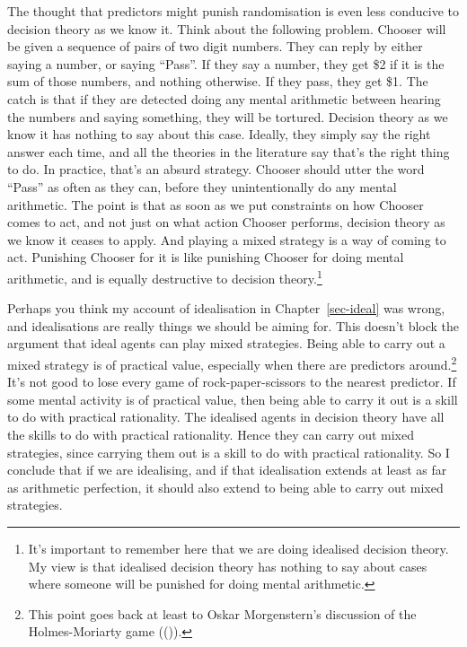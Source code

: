 \documentclass[
  12pt,
  letterpaper,
  DIV=11,
  numbers=noendperiod]{scrreprt}
\begin{document}
The thought that predictors might punish randomisation is even less
conducive to decision theory as we know it. Think about the following
problem. Chooser will be given a sequence of pairs of two digit numbers.
They can reply by either saying a number, or saying ``Pass''. If they
say a number, they get \$2 if it is the sum of those numbers, and
nothing otherwise. If they pass, they get \$1. The catch is that if they
are detected doing any mental arithmetic between hearing the numbers and
saying something, they will be tortured. Decision theory as we know it
has nothing to say about this case. Ideally, they simply say the right
answer each time, and all the theories in the literature say that's the
right thing to do. In practice, that's an absurd strategy. Chooser
should utter the word ``Pass'' as often as they can, before they
unintentionally do any mental arithmetic. The point is that as soon as
we put constraints on how Chooser comes to act, and not just on what
action Chooser performs, decision theory as we know it ceases to apply.
And playing a mixed strategy is a way of coming to act. Punishing
Chooser for it is like punishing Chooser for doing mental arithmetic,
and is equally destructive to decision theory.\footnote{It's important
  to remember here that we are doing idealised decision theory. My view
  is that idealised decision theory has nothing to say about cases where
  someone will be punished for doing mental arithmetic.}

Perhaps you think my account of idealisation in Chapter~\ref{sec-ideal}
was wrong, and idealisations are really things we should be aiming for.
This doesn't block the argument that ideal agents can play mixed
strategies. Being able to carry out a mixed strategy is of practical
value, especially when there are predictors around.\footnote{This point
  goes back at least to Oskar Morgenstern's discussion of the
  Holmes-Moriarty game
  (()).} It's
not good to lose every game of rock-paper-scissors to the nearest
predictor. If some mental activity is of practical value, then being
able to carry it out is a skill to do with practical rationality. The
idealised agents in decision theory have all the skills to do with
practical rationality. Hence they can carry out mixed strategies, since
carrying them out is a skill to do with practical rationality. So I
conclude that if we are idealising, and if that idealisation extends at
least as far as arithmetic perfection, it should also extend to being
able to carry out mixed strategies.
\end{document}
